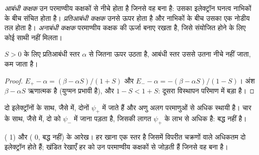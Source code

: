 \begin{definition}[आबंधी और प्रतिआबंधी कक्षक]\label{def:b2:diatomic-mos:bonding}
\emph{आबंधी कक्षक} उन परमाण्वीय कक्षकों से नीचे होता है जिनसे वह
बना है: उसका इलेक्ट्रॉन घनत्व नाभिकों के बीच संचित होता है।
\emph{प्रतिआबंधी कक्षक} उनसे ऊपर होता है और नाभिकों के बीच
उसका एक नोडीय तल होता है। \emph{अनाबंधी कक्षक}
परमाण्वीय कक्षक की ऊर्जा बनाए रखता है, जिसे संयोजित होने के लिए कोई
साथी नहीं मिलता।
\end{definition}

\begin{proposition}\label{prop:b2:diatomic-mos:asymmetry}
$S > 0$ के लिए प्रतिआबंधी स्तर $\alpha$ से जितना ऊपर उठता है, आबंधी स्तर
उससे उतना नीचे नहीं जाता, कम जाता है।
\end{proposition}

\begin{proof}
$E_+ - \alpha = (\beta - \alpha S)/(1 + S)$ और $E_- - \alpha = -(\beta - \alpha S)/(1 - S)$।
अंश $\beta - \alpha S$ ऋणात्मक है (युग्मन प्रभावी है), और $1 - S < 1
+ S$: दूसरा विस्थापन परिमाण में बड़ा है।
\end{proof}

दो इलेक्ट्रॉनों के साथ, जैसे  में, दोनों $\psi_+$ में जाते हैं और अणु
अलग परमाणुओं से अधिक स्थायी है। चार के साथ, जैसे  में, दो को $\psi_-$ में जाना पड़ता है,
जिसकी लागत $\psi_+$ के लाभ से अधिक है:  बद्ध नहीं है।

\begin{omfigure}
\begin{MOdiagram}
\end{MOdiagram}
\hspace{1.5cm}
\begin{MOdiagram}
\end{MOdiagram}

{\small {} ( 1) और  ( 0, बद्ध नहीं) के  आरेख। हर खाना एक स्तर है जिसमें विपरीत चक्रणों वाले अधिकतम
दो इलेक्ट्रॉन होते हैं; खंडित रेखाएँ हर  को उन परमाण्वीय कक्षकों से जोड़ती हैं
जिनसे वह बना है।}
\end{omfigure}

